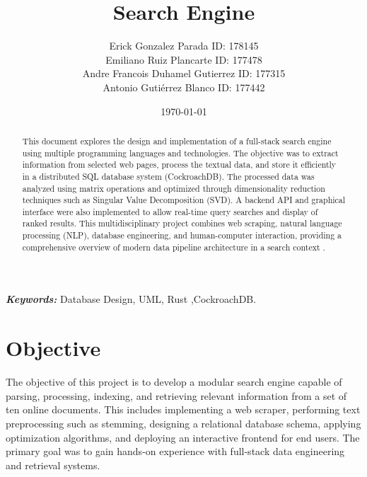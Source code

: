 \documentclass[twoside]{article}
\begin{document}

\title{Search Engine}
\author{\small{Erick Gonzalez Parada ID: 178145}\\
  \small{Emiliano Ruiz Plancarte ID: 177478} \\
  \small{Andre Francois Duhamel Gutierrez ID: 177315} \\
\small{Antonio Gutiérrez Blanco ID: 177442}}
\date{\today}
\maketitle

\begin{abstract}
  \raggedright
  This document explores the design and implementation of a full-stack search engine using multiple programming languages and technologies. The objective was to extract information from selected web pages, process the textual data, and store it efficiently in a distributed SQL database system (CockroachDB). The processed data was analyzed using matrix operations and optimized through dimensionality reduction techniques such as Singular Value Decomposition (SVD). A backend API and graphical interface were also implemented to allow real-time query searches and display of ranked results. This multidisciplinary project combines web scraping, natural language processing (NLP), database engineering, and human-computer interaction, providing a comprehensive overview of modern data pipeline architecture in a search context \cite{cockroach, stemmer}.
\end{abstract}

\begin{justify}
  \textbf{\textit{Keywords:}} Database Design, UML, Rust ,CockroachDB.
\end{justify}

\section{Objective}
The objective of this project is to develop a modular search engine capable of parsing, processing, indexing, and retrieving relevant information from a set of ten online documents. This includes implementing a web scraper, performing text preprocessing such as stemming, designing a relational database schema, applying optimization algorithms, and deploying an interactive frontend for end users. The primary goal was to gain hands-on experience with full-stack data engineering and retrieval systems.
\end{document}
